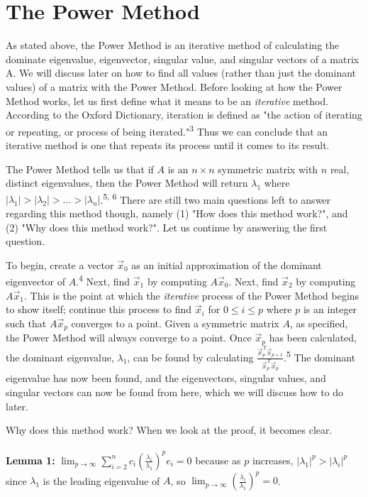 \documentclass{article}
\begin{document}
\section{The Power Method}
As stated above, the Power Method is an iterative method of calculating the dominate eigenvalue, eigenvector, singular value, and singular vectors of a matrix A. We will discuss later on how to find all values (rather than just the dominant values) of a matrix with the Power Method. Before looking at how the Power Method works, let us first define what it means to be an \textit{iterative} method. According to the Oxford Dictionary, iteration is defined as "the action of iterating or repeating, or process of being iterated."\textsuperscript{3} Thus we can conclude that an iterative method is one that repeats its process until it comes to its result.
\par The Power Method tells us that if $A$ is an $n \times n$ symmetric matrix with $n$ real, distinct eigenvalues, then the Power Method will return $\lambda_1$ where $|\lambda_1| > |\lambda_2| > ... > |\lambda_n|$.\textsuperscript{5, 6} There are still two main questions left to answer regarding this method though, namely (1) "How does this method work?", and (2) "Why does this method work?". Let us continue by answering the first question.
\par To begin, create a vector $\vec{x}^{\,}_0$ as an initial approximation of the dominant eigenvector of $A$.\textsuperscript{4} Next, find $\vec{x}^{\,}_1$ by computing $A\vec{x}^{\,}_0$. Next, find $\vec{x}^{\,}_2$ by computing $A\vec{x}^{\,}_1$. This is the point at which the \textit{iterative} process of the Power Method begins to show itself; continue this process to find $\vec{x}^{\,}_i$ for $0 \leq i \leq p$ where $p$ is an integer such that $A\vec{x}^{\,}_p$ converges to a point. Given a symmetric matrix $A$, as specified, the Power Method will always converge to a point. Once $\vec{x}^{\,}_p$ has been calculated, the dominant eigenvalue, $\lambda_1$, can be found by calculating $\frac{\vec{x}^{\,T}_p\vec{x}^{\,}_{p+1}}{\vec{x}^{\,T}_p\vec{x}^{\,}_{p}}$.\textsuperscript{5} The dominant eigenvalue has now been found, and the eigenvectors, singular values, and singular vectors can now be found from here, which we will discuss how to do later.
\par Why does this method work? When we look at the proof, it becomes clear. \\\\

\noindent \textbf{Lemma 1:} $\lim_{p\to\infty} \sum_{i=2}^{n} c_i(\frac{\lambda_i}{\lambda_1})^pe_i = 0$ because as $p$ increases, $|\lambda_1|^p > |\lambda_i|^p$ since $\lambda_1$ is the leading eigenvalue of $A$, so $\lim_{p\to\infty} (\frac{\lambda_i}{\lambda_1})^p = 0$.
\\\\
\end{document}
